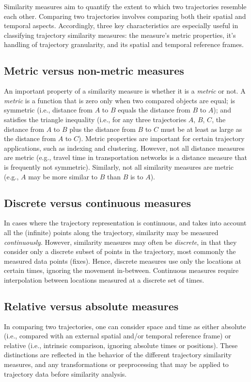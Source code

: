\documentclass{interact}
\begin{document}
Similarity measures aim to quantify the extent to which two trajectories resemble each other. Comparing two trajectories involves comparing both their spatial and temporal aspects. Accordingly, three key characteristics are especially useful in classifying trajectory similarity measures: the measure's metric properties, it's handling of trajectory granularity, and its spatial and temporal reference frames.  

\subsection{Metric versus non-metric measures}
An important property of a similarity measure is whether it is a \textit{metric} or not. A \emph{metric} is a function that is zero only when two compared objects are equal; is symmetric (i.e., distance from $A$ to $B$ equals the distance from $B$ to $A$); and satisfies the triangle inequality (i.e., for any three trajectories $A$, $B$, $C$, the distance from $A$ to $B$ plus the distance from $B$ to $C$ must be at least as large as the distance from $A$ to $C$). Metric properties are important for certain trajectory applications, such as indexing and clustering. However, not all distance measures are metric (e.g., travel time in transportation networks is a distance measure that is frequently not symmetric). Similarly, not all similarity measures are metric (e.g., $A$ may be more similar to $B$ than $B$ is to $A$).

\subsection{Discrete versus continuous measures}
In cases where the trajectory representation is continuous, and takes into account all the (infinite) points along the trajectory, similarity may be measured \emph{continuously}. However, similarity measures may often be \emph{discrete}, in that they consider only a discrete subset of points in the trajectory, most commonly the measured data points (fixes). Hence, discrete measures use only the locations at certain times, ignoring the movement in-between. Continuous measures require interpolation between locations measured at a discrete set of times. 

\subsection{Relative versus absolute measures}
In comparing two trajectories, one can consider space and time as either absolute (i.e., compared with an external spatial and/or temporal reference frame) or relative (i.e., intrinsic comparison, ignoring absolute times or positions). These distinctions are reflected in the behavior of the different trajectory similarity measures, and any transformations or preprocessing that may be applied to trajectory data before similarity analysis.
\end{document}

